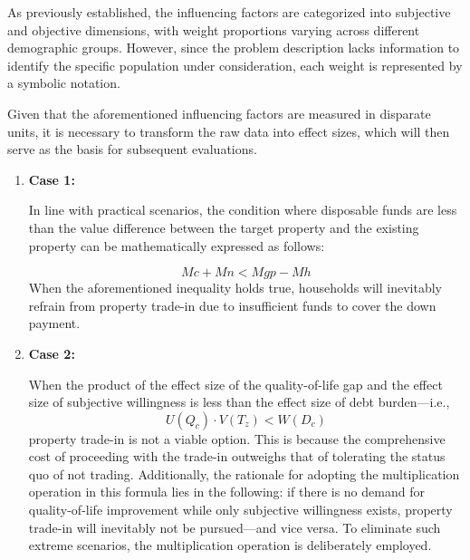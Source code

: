 \documentclass{mcmthesis}
\begin{document}
As previously established, the influencing factors are categorized into subjective and objective dimensions, 
with weight proportions varying across different demographic groups. However,
since the problem description lacks information to identify the specific population under consideration, 
each weight is represented by a symbolic notation.



Given that the aforementioned influencing factors are measured in disparate units, 
it is necessary to transform the raw data into effect sizes, 
which will then serve as the basis for subsequent evaluations.

\begin{enumerate}[label=(\arabic*), leftmargin=4em, itemsep=0pt]
\item \textbf{Case 1:}

In line with practical scenarios, the condition where disposable funds are 
less than the value difference between the target property and the existing property can be mathematically expressed as follows:

\begin{equation} \label{eq:case1}  %
Mc+Mn<Mgp-Mh
\end{equation}
When the aforementioned inequality holds true, 
households will inevitably refrain from property trade-in due to insufficient funds to cover the down payment.


\item \textbf{Case 2:}

When the product of the effect size of the quality-of-life gap 
and the effect size of subjective willingness is less than the effect size of debt burden—i.e.,
\begin{equation} \label{eq:case2}  %
U(Q_c) \cdot V(T_z) < W(D_c)
\end{equation}
property trade-in is not a viable option. This is because the comprehensive cost of proceeding with the trade-in outweighs 
that of tolerating the status quo of not trading. Additionally, the rationale for adopting the multiplication operation 
in this formula lies in the following: 
if there is no demand for quality-of-life improvement while only subjective willingness exists, 
property trade-in will inevitably not be pursued—and vice versa. To eliminate such extreme scenarios, 
the multiplication operation is deliberately employed.

\end{enumerate}
\end{document}
